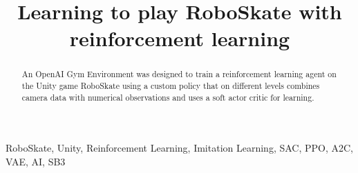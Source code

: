 \documentclass[conference]{IEEEtran}
\begin{document}

\title{Learning to play RoboSkate with reinforcement learning}


\author{

}

\maketitle

\thispagestyle{plain}
\pagestyle{plain}


\begin{abstract}
An OpenAI Gym Environment was designed to train a reinforcement learning agent on the Unity game RoboSkate using a custom policy that on different levels combines camera data with numerical observations and uses a soft actor critic for learning.\\
\end{abstract}

\begin{IEEEkeywords}
RoboSkate, Unity, Reinforcement Learning, Imitation Learning, SAC, PPO, A2C, VAE, AI, SB3
\end{IEEEkeywords}

\tableofcontents

\end{document}
